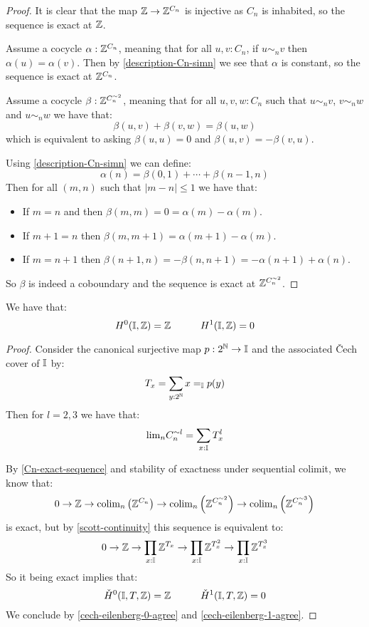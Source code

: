 \begin{proof}
It is clear that the map $\mathbb{Z}\to \mathbb{Z}^{C_n}$ is injective as $C_n$ is inhabited, so the sequence is exact at $\mathbb{Z}$.

Assume a cocycle $\alpha:\mathbb{Z}^{C_n}$, meaning that for all $u,v:C_n$, if $u\sim_nv$ then $\alpha(u)=\alpha(v)$. Then by \cref{description-Cn-simn} we see that $\alpha$ is constant, so the sequence is exact at $\mathbb{Z}^{C_n}$.

Assume a cocycle $\beta:\mathbb{Z}^{C_n^{\sim2}}$, meaning that for all $u,v,w:C_n$ such that $u\sim_nv$, $v\sim_nw$ and $u\sim_nw$ we have that:
\[\beta(u,v)+\beta(v,w) = \beta(u,w)\]
which is equivalent to asking $\beta(u,u)=0$ and $\beta(u,v) = -\beta(v,u)$.

Using \cref{description-Cn-simn} we can define: 
\[\alpha(n) = \beta(0,1)+\cdots+\beta(n-1,n)\]
Then for all $(m,n)$ such that $|m-n|\leq 1$ we have that:
\begin{itemize} 
\item If $m=n$ and then $\beta(m,m) = 0 = \alpha(m)-\alpha(m)$.
\item If $m+1=n$ then $\beta(m,m+1) = \alpha(m+1)-\alpha(m)$.
\item If $m=n+1$ then $\beta(n+1,n) = - \beta(n,n+1) = -\alpha(n+1)+\alpha(n)$.
\end{itemize}
So $\beta$ is indeed a coboundary and the sequence is exact at $\mathbb{Z}^{C_n^{\sim2}}$.
\end{proof}

\begin{proposition}\label{cohomology-I}
We have that:
\[H^0(\mathbb{I},\mathbb{Z}) = \mathbb{Z}\quad \quad \quad H^1(\mathbb{I},\mathbb{Z}) = 0\]
\end{proposition}

\begin{proof}
Consider the canonical surjective map $p:2^{\mathbb{N}}\to\mathbb{I}$ and the associated \v{C}ech cover of $\mathbb{I}$ by: 
\[T_x = \sum_{y:2^{\mathbb{N}}} x=_{\mathbb{I}} p(y)\]
Then for $l=2,3$ we have that:
\[\mathrm{lim}_nC_n^{\sim l} = \sum_{x:\mathbb{I}} T_x^l\]

By \cref{Cn-exact-sequence} and stability of exactness under sequential colimit, we know that:
\[ 0\to \mathbb{Z}\to \mathrm{colim}_n \left(\mathbb{Z}^{C_n}\right) \to \mathrm{colim}_n \left(\mathbb{Z}^{C_n^{\sim2}}\right)\to \mathrm{colim}_n \left(\mathbb{Z}^{C_n^{\sim3}}\right)\]
is exact, but by \cref{scott-continuity} this sequence is equivalent to:
\[ 0\to \mathbb{Z}\to \prod_{x:\mathbb{I}}\mathbb{Z}^{T_x} \to  \prod_{x:\mathbb{I}}\mathbb{Z}^{T_x^2} \to  \prod_{x:\mathbb{I}}\mathbb{Z}^{T_x^3}\]
So it being exact implies that:
\[\check{H}^0(\mathbb{I},T,\mathbb{Z}) = \mathbb{Z} \quad \quad \quad \check{H}^1(\mathbb{I},T,\mathbb{Z}) = 0\]
We conclude by \cref{cech-eilenberg-0-agree} and \cref{cech-eilenberg-1-agree}.
\end{proof}

